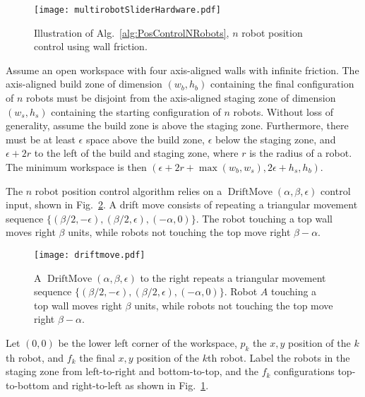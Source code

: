 \begin{figure}
\begin{center}
	\texttt{[image: multirobotSliderHardware.pdf]}
\end{center}
\vspace{-1em}
\caption{\label{fig:construction2d}
Illustration of Alg.\ \ref{alg:PosControlNRobots}, $n$ robot position control  using wall friction.
}
\end{figure}


Assume an open workspace with four axis-aligned walls with infinite friction.
The axis-aligned build zone of dimension $(w_b, h_b)$ containing the final configuration of $n$ robots must be disjoint from the axis-aligned staging zone of dimension $(w_s, h_s)$  containing the starting configuration of $n$ robots. Without loss of generality, assume the build zone  is above the staging zone. 
Furthermore, there must be at least $\epsilon$ space above the build zone, $\epsilon$ below the staging zone, and $\epsilon + 2r$ to the left of the build and staging zone, where $r$ is the radius of a robot.  The minimum workspace is then $(\epsilon + 2r + \max(w_b,w_s), 2\epsilon + h_s,h_b)$.

The $n$ robot position control algorithm relies on a $\operatorname{DriftMove}(\alpha, \beta, \epsilon)$ control input, shown in Fig.\  \ref{fig:driftmove}.
A drift move consists of repeating a triangular movement sequence $\{ (\beta/2,-\epsilon),(\beta/2,\epsilon),(-\alpha,0)\}$. The robot touching a top wall moves right $\beta$ units, while robots not touching the top move right $\beta-\alpha$.

\begin{figure}
\begin{center}
	\texttt{[image: driftmove.pdf]}
\end{center}
\vspace{-1em}
\caption{\label{fig:driftmove}
A  $\operatorname{DriftMove}(\alpha, \beta, \epsilon)$ to the right repeats a triangular movement sequence $\{ (\beta/2,-\epsilon),(\beta/2,\epsilon),(-\alpha,0)\}$. Robot $A$ touching a top wall moves right $\beta$ units, while robots not touching the top move right $\beta-\alpha$.}
\end{figure}

Let $(0,0)$ be the lower left corner of the workspace, $p_k$ the $x,y$ position of the $k$th robot, and $f_k$ the final $x,y$ position of the $k$th robot. Label the robots in the staging zone from left-to-right and bottom-to-top, and the $f_k$ configurations top-to-bottom and right-to-left as shown in Fig.~\ref{fig:construction2d}.

